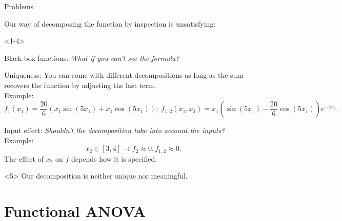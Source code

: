 \documentclass[english,aspectratio=169]{beamer}
\let\tempone\itemize
\let\temptwo\enditemize
\renewenvironment{itemize}{\tempone\addtolength{\itemsep}{0.35\baselineskip}}{\temptwo}
\renewcommand{\emph}[1]{\textcolor[HTML]{006d2c}{\fontseries{sb}\selectfont #1}}
\begin{document}
\begin{frame}[fragile]{Problems}
\small

Our way of decomposing the function by inspection is unsatisfying:
\vspace{1.5em}
\begin{onlyenv}<1-4>
\begin{itemize}
  \item<2-4> \emph{Black-box functions}: \textit{What if you can't see the formula?}
  \item<3-4> \emph{Uniqueness}: You can come with different decompositions as long as the sum recovers the function by adjusting the last term.\\
  \vspace{1.0em}
  Example:
  \begin{equation*}
    f_1(x_1) = \frac{20}{6} \left( x_1 \sin{(5 x_1)} + x_1 \cos{(5 x_1)} \right); \; f_{1, 2}(x_1, x_2) = x_1 \left( \sin{(5 x_1)} - \frac{20}{6} \cos{(5 x_1)} \right) e^{-5 x_2}.
  \end{equation*}

  \item<4-4> \emph{Input effect}: \textit{Shouldn't the decomposition take into account the inputs?}\\
  \vspace{1.0em}
  Example:
  \begin{equation*}
    x_2 \in [3, 4] \rightarrow f_2 \approx 0, f_{1, 2} \approx 0.
  \end{equation*}
  \vspace{1.0em}
  The effect of $x_2$ on $f$ depends how it is specified.

\end{itemize}
\end{onlyenv}

\begin{exampleblock}<5>{}
  \centering
  \emph{Our decomposition is neither unique nor meaningful.}
\end{exampleblock}

\end{frame}

\section{Functional ANOVA}
\end{document}
